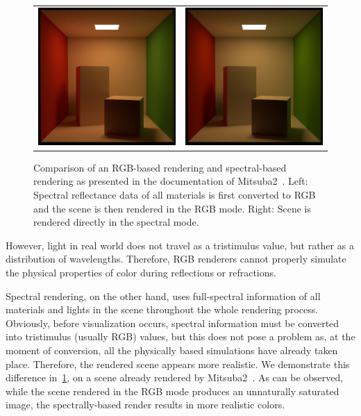 \begin{figure}[t]
	\centering
	{\sffamily
		\begin{tabular}{cc}
			\includegraphics[width=0.45\linewidth]{img/mitsuba_rgb_mode.jpg}
			&
			\includegraphics[width=0.45\linewidth]{img/mitsuba_spectral_mode.jpg}\\
		\end{tabular}
	}
	\caption{Comparison of an RGB-based rendering and spectral-based rendering as presented in the documentation of Mitsuba2~\cite{Mitsuba2}. Left: Spectral reflectance data of all materials is first converted to RGB and the scene is then rendered in the RGB mode. Right: Scene is rendered directly in the spectral mode.}
	\label{fig:mitsubaRGBSpectralComparison}
\end{figure}

However, light in real world does not travel as a tristimulus value, but rather as a distribution of wavelengths. Therefore, RGB renderers cannot properly simulate the physical properties of color during reflections or refractions.

Spectral rendering, on the other hand, uses full-spectral information of all materials and lights in the scene throughout the whole rendering process. Obviously, before visualization occurs, spectral information must be converted into tristimulus (usually RGB) values, but this does not pose a problem as, at the moment of conversion, all the physically based simulations have already taken place. Therefore, the rendered scene appears more realistic. We demonstrate this difference in~\cref{fig:mitsubaRGBSpectralComparison}, on a scene already rendered by Mitsuba2~\cite{Mitsuba2}. As can be observed, while the scene rendered in the RGB mode produces an unnaturally saturated image, the spectrally-based render results in more realistic colors.

